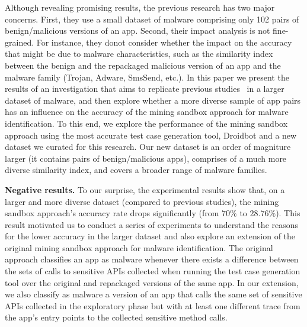 Although revealing promising results, the previous research has two major concerns. First, they use a small dataset of malware comprising only 102 pairs of benign/malicious versions of an app. Second, their impact analysis is not fine-grained. For instance, they donot consider whether the impact on the accuracy that might be due to malware characteristics, such as the similarity index between the benign and the repackaged malicious version of an app and the malware family (Trojan, Adware, SmsSend, etc.). In this paper we present the results of an investigation that aims to replicate previous studies~\cite{DBLP:conf/wcre/BaoLL18,DBLP:conf/scam/CostaMCMVBC20} in a larger dataset of malware, and then explore whether a more diverse sample of app pairs has an influence on the accuracy of the mining sandbox approach for malware identification. To this end, we explore the performance of the mining sandbox approach using the most accurate test case generation tool, Droidbot and a new dataset we curated for this research. Our new dataset is an order of magniture larger (it contains \apps pairs of benign/malicious apps), comprises of a much more diverse similarity index, and covers a broader range of malware families. 



{\bf Negative results.} To our surprise, the experimental results show that, on a larger and more diverse dataset (compared to previous studies), the mining sandbox approach's accuracy rate drops significantly (from $70\%$ to $28.76\%$). This result motivated us to conduct a series of experiments to understand the reasons for the lower accuracy in the larger dataset and also explore an extension of the original mining sandbox approach for malware identification. The original approach classifies an app as malware whenever there exists a difference between the sets of calls to sensitive APIs collected when running the test case generation tool over the original and repackaged versions of the same app. In our extension, we also classify as malware a version of an app that calls the same set of sensitive APIs collected in the exploratory phase but with at least one different trace from the app's entry points to the collected sensitive method calls.


